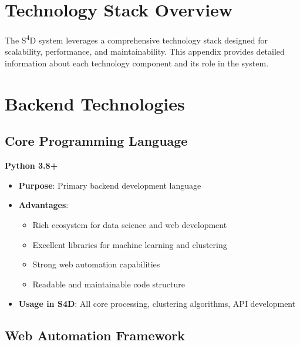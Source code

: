 \section{Technology Stack Overview}
\label{sec:tech-overview}

The S\textsuperscript{4}D system leverages a comprehensive technology stack designed for scalability, performance, and maintainability. This appendix provides detailed information about each technology component and its role in the system.

\section{Backend Technologies}
\label{sec:backend-tech}

\subsection{Core Programming Language}
\label{subsec:core-language}

\textbf{Python 3.8+}
\begin{itemize}
    \item \textbf{Purpose}: Primary backend development language
    \item \textbf{Advantages}: 
        \begin{itemize}
            \item Rich ecosystem for data science and web development
            \item Excellent libraries for machine learning and clustering
            \item Strong web automation capabilities
            \item Readable and maintainable code structure
        \end{itemize}
    \item \textbf{Usage in S4D}: All core processing, clustering algorithms, API development
\end{itemize}

\subsection{Web Automation Framework}
\label{subsec:selenium}

